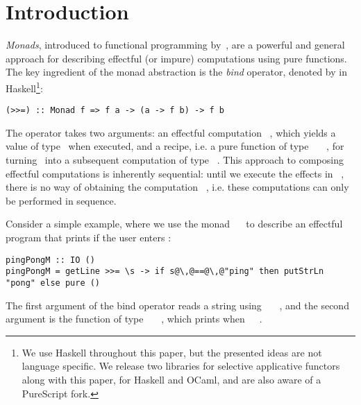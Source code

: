 \vspace{-0.5mm}
\section{Introduction}\label{sec-intro}

\emph{Monads}, introduced to functional programming
by~\citet{1995_wadler_monads}, are a powerful and general approach for
describing effectful (or impure) computations using pure functions. The key
ingredient of the monad abstraction is the \emph{bind} operator, denoted by
\hs{>>=} in Haskell\footnote{We use Haskell throughout this paper, but the
presented ideas are not language specific. We release two libraries for
selective applicative functors along with this paper, for Haskell and OCaml, and
are also aware of a PureScript fork.}:

\begin{verbatim}
(>>=) :: Monad f => f a -> (a -> f b) -> f b
\end{verbatim}

\noindent
The operator takes two arguments: an effectful computation ~, which
yields a value of type~ when executed, and a recipe, i.e. a pure function
of type ~\hs{->}~~, for turning~ into a subsequent
computation of type ~. This approach to composing effectful
computations is inherently sequential: until we execute the effects in
~, there is no way of obtaining the computation ~,
i.e. these computations can only be performed in sequence.

Consider a simple example, where we use the monad ~\hs{=}~ to
describe an effectful program that prints  if the user enters
:

\vspace{0.5mm}
\begin{verbatim}
pingPongM :: IO ()
pingPongM = getLine >>= \s -> if s@\,@==@\,@"ping" then putStrLn "pong" else pure ()
\end{verbatim}
\vspace{0.5mm}

\noindent
The first argument of the bind operator reads a string using
~\hs{::}~~, and the second argument is the
function of type ~\hs{->}~~\hs{()}, which prints 
when~~\hs{==}~.

